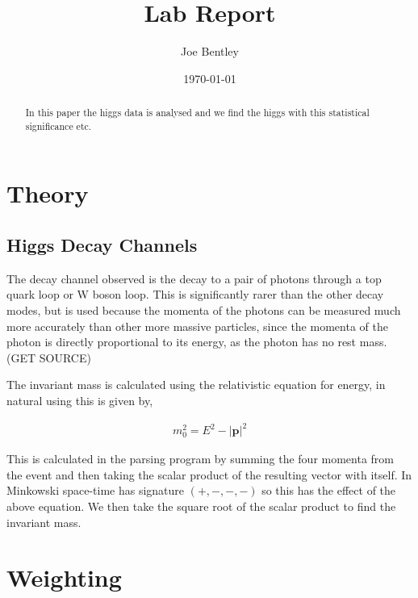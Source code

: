 \documentclass[11pt]{amsart}
\title{Lab Report}
\author{Joe Bentley}
\date{\today}
\begin{document}
\begin{abstract}
  In this paper the higgs data is analysed and we find the higgs with this statistical significance etc.
\end{abstract}

\maketitle

\newpage

\pagestyle{fancyplain}


\begin{multicols}{2}

\section{Theory}

\subsection{Higgs Decay Channels}

The decay channel observed is the decay to a pair of photons through a top quark loop or W boson loop. This is significantly rarer than the other decay modes, but is used because the momenta of the photons can be measured much more accurately than other more massive particles, since the momenta of the photon is directly proportional to its energy, as the photon has no rest mass. (GET SOURCE)

The invariant mass is calculated using the relativistic equation for energy, in natural using this is given by,

\begin{align*}
  m_0^2 = E^2 - {|\mathbf{p}|}^2
\end{align*}

This is calculated in the parsing program by summing the four momenta from the event and then taking the scalar product of the resulting vector with itself. In Minkowski space-time has signature $(+, -, -, -)$ so this has the effect of the above equation. We then take the square root of the scalar product to find the invariant mass.

\section{Weighting}


\end{multicols}
\end{document}

